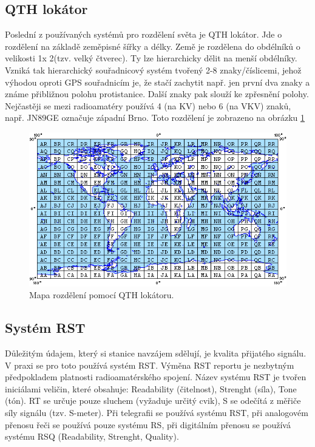 \subsection{QTH lokátor}

Poslední z používaných systémů pro rozdělení světa je QTH lokátor. Jde o rozdělení na základě zeměpisné šířky a délky.
Země je rozdělena do obdélníků o velikosti 1\degree x 2\degree (tzv. velký
čtverec). Ty lze hierarchicky dělit na menší obdélníky. Vzniká tak hierarchický
souřadnicový systém tvořený 2-8 znaky/číslicemi, jehož výhodou  oproti GPS
souřadnicím je, že stačí zachytit např. jen první dva znaky a známe přibližnou
polohu protistanice. Další znaky pak slouží ke zpřesnění polohy. Nejčastěji se
mezi radioamatéry používá 4 (na KV) nebo 6 (na VKV) znaků, např. JN89GE označuje
západní Brno. Toto rozdělení je zobrazeno na obrázku \ref{fig:qth}

\begin{figure}[h]
\centering
\includegraphics[trim=0cm 0cm 0cm 0cm, scale=0.7]{fig/QTH_locator}
\caption{Mapa rozdělení pomocí QTH lokátoru.}
\label{fig:qth}
\end{figure}

\subsection{Systém RST}

Důležitým údajem, který si stanice navzájem sdělují, je kvalita přijatého
signálu. V praxi se pro toto používá systém RST. Výměna RST reportu je nezbytným předpokladem platnosti radioamatérského spojení.
Název systému RST je tvořen iniciálami veličin, které obsahuje: Readability (čitelnost), Strenght (síla), Tone (tón).
RT se určuje pouze sluchem (vyžaduje určitý cvik), S se odečítá z měřiče síly
signálu (tzv. S-meter).
Při telegrafii se používá systému RST, při analogovém přenosu řeči se používá
pouze systému RS, při digitálním přenosu se používá systému RSQ (Readability, Strenght, Quality).

